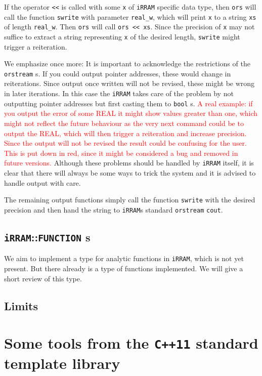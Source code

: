 \documentclass{article}
\newcommand{\irram}{\texttt{iRRAM}\xspace}
\newcommand{\irrams}{\texttt{iRRAM}s\xspace}
\newcommand{\ccOx}{\texttt{C++11}\xspace}
\newcommand{\ir}[1]{\texttt{#1}\xspace}
\newcommand{\code}[1]{\texttt{#1}\xspace}
\newcommand{\temp}[1]{\textcolor{red}{#1}}
\begin{document}
If the operator \code{<<} is called with some \code{x} of \irram specific data type, then \code{ors} will call the function \ir{swrite} with parameter \ir{real\_w}, which will print \code{x} to a string \code{xs} of length \ir{real\_w}. Then \code{ors} will call \code{ors << xs}. Since the precision of \code{x} may not suffice to extract a string representing \code{x} of the desired length, \ir{swrite} might trigger a reiteration.

We emphasize once more: It is important to acknowledge the restrictions of the \ir{orstream}s. If you could output pointer addresses, these would change in reiterations. Since output once written will not be revised, these might be wrong in later iterations. In this case the \irram takes care of the problem by not outputting pointer addresses but first casting them to \code{bool}s. \temp{A real example: if you output the error of some REAL it might show values greater than one, which might not reflect the future behaviour as the very next command could be to output the REAL, which will then trigger a reiteration and increase precision. Since the output will not be revised the result could be confusing for the user. This is put down in red, since it might be considered a bug and removed in future versions.} Although these problems should be handled by \irram itself, it is clear that there will always be some ways to trick the system and it is advised to handle output with care.

The remaining output functions simply call the function \ir{swrite} with the desired precision and then hand the string to \irrams standard \ir{orstream} \ir{cout}.

\subsection{\irram::\ir{FUNCTION}s}

We aim to implement a type for analytic functions in \irram, which is not yet present. But there already is a type of functions implemented. We will give a short review of this type.

\subsection{Limits}

\section{Some tools from the \ccOx standard template library}
\end{document}
